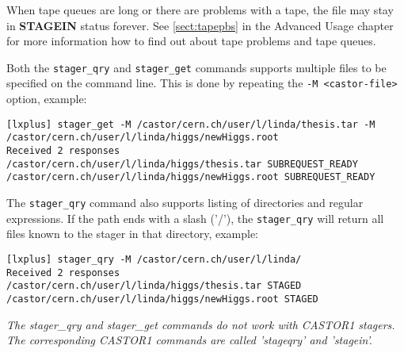When tape queues are long or there are problems with a tape, the file may stay in {\bf STAGEIN}
status forever. See \ref{sect:tapepbs} in the Advanced Usage chapter for more information how
to find out about tape problems and tape queues.

Both the {\tt stager\_qry} and {\tt stager\_get} commands supports multiple files to be specified
on the command line. This is done by repeating the {\tt -M <castor-file>} option, example:
\small
\begin{verbatim}
[lxplus] stager_get -M /castor/cern.ch/user/l/linda/thesis.tar -M /castor/cern.ch/user/l/linda/higgs/newHiggs.root
Received 2 responses
/castor/cern.ch/user/l/linda/higgs/thesis.tar SUBREQUEST_READY
/castor/cern.ch/user/l/linda/higgs/newHiggs.root SUBREQUEST_READY
\end{verbatim}
\normalsize

The {\tt stager\_qry} command also supports listing of directories and regular expressions.
If the path ends with a slash ('/'), the {\tt stager\_qry} will return all files known to the
stager in that directory, example:
\small
\begin{verbatim}
[lxplus] stager_qry -M /castor/cern.ch/user/l/linda/
Received 2 responses
/castor/cern.ch/user/l/linda/higgs/thesis.tar STAGED
/castor/cern.ch/user/l/linda/higgs/newHiggs.root STAGED
\end{verbatim}
\normalsize

{\em The stager\_qry and stager\_get commands do not work with CASTOR1 stagers.}
{\em The corresponding CASTOR1 commands are called 'stageqry' and 'stagein'.}

